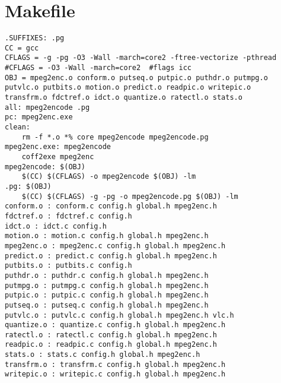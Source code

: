 \appendix
\chapter{Makefile}
\begin{lstlisting}
.SUFFIXES: .pg
CC = gcc
CFLAGS = -g -pg -O3 -Wall -march=core2 -ftree-vectorize -pthread
#CFLAGS = -O3 -Wall -march=core2  #flags icc
OBJ = mpeg2enc.o conform.o putseq.o putpic.o puthdr.o putmpg.o 
putvlc.o putbits.o motion.o predict.o readpic.o writepic.o 
transfrm.o fdctref.o idct.o quantize.o ratectl.o stats.o
all: mpeg2encode .pg
pc: mpeg2enc.exe
clean:
	rm -f *.o *% core mpeg2encode mpeg2encode.pg
mpeg2enc.exe: mpeg2encode
	coff2exe mpeg2enc
mpeg2encode: $(OBJ)
	$(CC) $(CFLAGS) -o mpeg2encode $(OBJ) -lm
.pg: $(OBJ)
	$(CC) $(CFLAGS) -g -pg -o mpeg2encode.pg $(OBJ) -lm
conform.o : conform.c config.h global.h mpeg2enc.h 
fdctref.o : fdctref.c config.h 
idct.o : idct.c config.h 
motion.o : motion.c config.h global.h mpeg2enc.h 
mpeg2enc.o : mpeg2enc.c config.h global.h mpeg2enc.h 
predict.o : predict.c config.h global.h mpeg2enc.h 
putbits.o : putbits.c config.h 
puthdr.o : puthdr.c config.h global.h mpeg2enc.h 
putmpg.o : putmpg.c config.h global.h mpeg2enc.h 
putpic.o : putpic.c config.h global.h mpeg2enc.h 
putseq.o : putseq.c config.h global.h mpeg2enc.h 
putvlc.o : putvlc.c config.h global.h mpeg2enc.h vlc.h 
quantize.o : quantize.c config.h global.h mpeg2enc.h 
ratectl.o : ratectl.c config.h global.h mpeg2enc.h 
readpic.o : readpic.c config.h global.h mpeg2enc.h 
stats.o : stats.c config.h global.h mpeg2enc.h 
transfrm.o : transfrm.c config.h global.h mpeg2enc.h 
writepic.o : writepic.c config.h global.h mpeg2enc.h 
\end{lstlisting}



